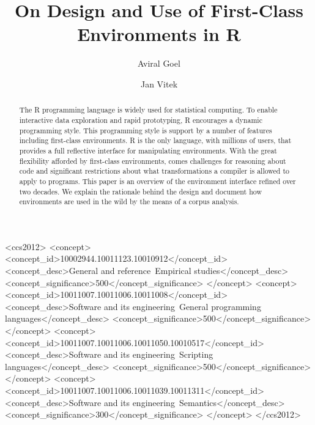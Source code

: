 \documentclass[10pt,review,sigplan,anonymous=true,authorversion=true,nonacm=true]{acmart}
\begin{document}
\title{On Design and Use of First-Class Environments in R}

\author{Aviral Goel}
\author{Jan Vitek}
\authorsaddresses{}
\renewcommand{\shortauthors}{Goel, et al.}


\begin{abstract}
  The R programming language is widely used for statistical computing. To enable
  interactive data exploration and rapid prototyping, R encourages a dynamic
  programming style. This programming style is support by a number of features
  including first-class environments. R is the only language, with millions of
  users, that provides a full reflective interface for manipulating
  environments. With the great flexibility afforded by first-class environments,
  comes challenges for reasoning about code and significant restrictions about
  what transformations a compiler is allowed to apply to programs. This paper is
  an overview of the environment interface refined over two decades. We explain
  the rationale behind the design and document how environments are used in the
  wild by the means of a corpus analysis.
\end{abstract}

\begin{CCSXML}
<ccs2012>
<concept>
<concept_id>10002944.10011123.10010912</concept_id>
<concept_desc>General and reference~Empirical studies</concept_desc>
<concept_significance>500</concept_significance>
</concept>
<concept>
<concept_id>10011007.10011006.10011008</concept_id>
<concept_desc>Software and its engineering~General programming languages</concept_desc>
<concept_significance>500</concept_significance>
</concept>
<concept>
<concept_id>10011007.10011006.10011050.10010517</concept_id>
<concept_desc>Software and its engineering~Scripting languages</concept_desc>
<concept_significance>500</concept_significance>
</concept>
<concept>
<concept_id>10011007.10011006.10011039.10011311</concept_id>
<concept_desc>Software and its engineering~Semantics</concept_desc>
<concept_significance>300</concept_significance>
</concept>
</ccs2012>
\end{CCSXML}

\end{document}
